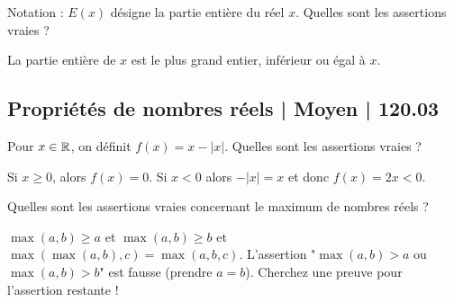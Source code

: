 \begin{question}

Notation : $E(x)$ désigne la partie entière du réel $x$.
Quelles sont les assertions vraies ?
\begin{answers}



\end{answers}
\begin{explanations}
La partie entière de $x$ est le plus grand entier, inférieur ou égal à $x$.
\end{explanations}
\end{question}



\subsection{Propriétés de nombres réels | Moyen | 120.03}

\begin{question}

Pour $x\in\mathbb{R}$, on définit $f(x)= x - |x|$.
Quelles sont les assertions vraies ?
\begin{answers}

    

  
\end{answers}
\begin{explanations}
Si $x \ge 0$, alors $f(x)=0$. Si $x<0$ alors $-|x|=x$ et donc $f(x)=2x<0$.
\end{explanations}
\end{question}


\begin{question}

Quelles sont les assertions vraies concernant le maximum de nombres réels ?
\begin{answers}



\end{answers}
\begin{explanations}
$\max(a,b) \ge a$ et $\max(a,b) \ge b$ et $\max( \max(a,b), c ) = \max(a,b,c)$. L'assertion "$\max(a,b) > a$ ou $\max(a,b) > b$" est fausse (prendre $a=b$). Cherchez une preuve pour l'assertion restante !
\end{explanations}
\end{question}




